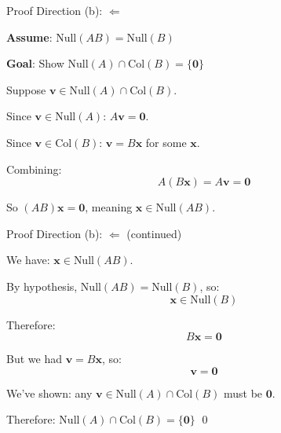 \documentclass[10pt]{beamer}
\theoremstyle{definition}
\newcommand{\x}[1]{\alert{\textbf{#1}}}
\begin{document}
\begin{frame}{Proof Direction (b): $\Leftarrow$}

\x{Assume}: $\text{Null}(AB) = \text{Null}(B)$

\x{Goal}: Show $\text{Null}(A) \cap \text{Col}(B) = \{\mathbf{0}\}$

\vspace{1em}

Suppose $\mathbf{v} \in \text{Null}(A) \cap \text{Col}(B)$.

\vspace{1em}

Since $\mathbf{v} \in \text{Null}(A)$: $A\mathbf{v} = \mathbf{0}$.

Since $\mathbf{v} \in \text{Col}(B)$: $\mathbf{v} = B\mathbf{x}$ for some $\mathbf{x}$.

\vspace{1em}

Combining:
$$A(B\mathbf{x}) = A\mathbf{v} = \mathbf{0}$$

So $(AB)\mathbf{x} = \mathbf{0}$, meaning $\mathbf{x} \in \text{Null}(AB)$.

\end{frame}

\begin{frame}{Proof Direction (b): $\Leftarrow$ (continued)}

We have: $\mathbf{x} \in \text{Null}(AB)$.

\vspace{1em}

By hypothesis, $\text{Null}(AB) = \text{Null}(B)$, so:
$$\mathbf{x} \in \text{Null}(B)$$

\vspace{1em}

Therefore:
$$B\mathbf{x} = \mathbf{0}$$

\vspace{1em}

But we had $\mathbf{v} = B\mathbf{x}$, so:
$$\mathbf{v} = \mathbf{0}$$

\vspace{1em}

We've shown: any $\mathbf{v} \in \text{Null}(A) \cap \text{Col}(B)$ must be $\mathbf{0}$.

Therefore: $\text{Null}(A) \cap \text{Col}(B) = \{\mathbf{0}\}$ \qed

\end{frame}
\end{document}
